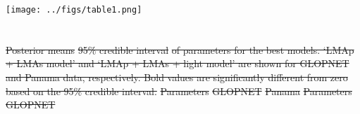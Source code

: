 \documentclass[
  12pt,
]{article}
\providecommand{\DIFdeltex}[1]{{\protect\color{red}\sout{#1}}}                      %
\providecommand{\DIFaddbegin}{} %
\providecommand{\DIFaddend}{} %
\providecommand{\DIFdelbegin}{} %
\providecommand{\DIFdelend}{} %
\providecommand{\DIFdel}[1]{\texorpdfstring{\DIFdeltex{#1}}{}} %
\newcommand{\DIFscaledelfig}{0.5}
\newlength{\DIFdelgraphicswidth} %
\newlength{\DIFdelgraphicsheight} %
\newcommand{\DIFaddincludegraphics}[2][]{{\color{blue}\fbox{\DIFOincludegraphics[#1]{#2}}}} %
\newcommand{\DIFdelincludegraphics}[2][]{%
\sbox{\DIFdelgraphicsbox}{\DIFOincludegraphics[#1]{#2}}%
\settoboxwidth{\DIFdelgraphicswidth}{\DIFdelgraphicsbox} %
\settoboxtotalheight{\DIFdelgraphicsheight}{\DIFdelgraphicsbox} %
\scalebox{\DIFscaledelfig}{%
\parbox[b]{\DIFdelgraphicswidth}{\usebox{\DIFdelgraphicsbox}\\[-\baselineskip] \rule{\DIFdelgraphicswidth}{0em}}\llap{\resizebox{\DIFdelgraphicswidth}{\DIFdelgraphicsheight}{%
\setlength{\unitlength}{\DIFdelgraphicswidth}%
\begin{picture}(1,1)%
\thicklines\linethickness{2pt} %
{\color[rgb]{1,0,0}\put(0,0){\framebox(1,1){}}}%
{\color[rgb]{1,0,0}\put(0,0){\line( 1,1){1}}}%
{\color[rgb]{1,0,0}\put(0,1){\line(1,-1){1}}}%
\end{picture}%
}\hspace*{3pt}}} %
} %
\DeclareRobustCommand{\DIFaddbegin}{\DIFOaddbegin \let\includegraphics\DIFaddincludegraphics} %
\DeclareRobustCommand{\DIFaddend}{\DIFOaddend \let\includegraphics\DIFOincludegraphics} %
\DeclareRobustCommand{\DIFdelbegin}{\DIFOdelbegin \let\includegraphics\DIFdelincludegraphics} %
\DeclareRobustCommand{\DIFdelend}{\DIFOaddend \let\includegraphics\DIFOincludegraphics} %
\begin{document}
\DIFaddbegin \texttt{[image: ../figs/table1.png]}

\DIFaddend \newpage

\DIFdelbegin %
\DIFdelend \DIFaddbegin \hypertarget{section}{%
\section{}\label{section}}
\DIFaddend 

\DIFdelbegin %
{%
\DIFdel{Posterior means }%
\DIFdel{95\% credible interval}%
\DIFdel{of parameters for the best models. `LMAp + LMAs model' and `LMAp + LMAs + light model' are shown for GLOPNET and Panama data, respectively. Bold values are significantly different from zero based on the 95\% credible interval.}}%
\DIFdel{Parameters
}%
\DIFdel{GLOPNET
}%
\DIFdel{Panama
}%
\DIFdel{Parameters
}%
\DIFdel{GLOPNET
}%
\end{document}
